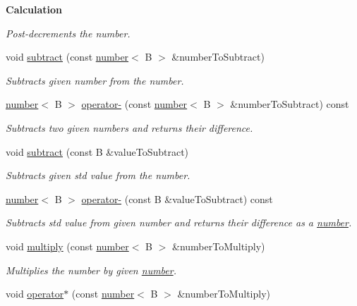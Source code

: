 \begin{Indent}{\bf Calculation}
\begin{DoxyCompactItemize}
\begin{DoxyCompactList}\small\item\em Post-\/decrements the number. \end{DoxyCompactList}\item 
void \hyperlink{classcjr_1_1number_aa29378479836924b1110f40570198ada}{subtract} (const \hyperlink{classcjr_1_1number}{number}$<$ B $>$ \&number\-To\-Subtract)
\begin{DoxyCompactList}\small\item\em Subtracts given number from the number. \end{DoxyCompactList}\item 
\hypertarget{classcjr_1_1number_a9b54e89597d8db867a7d30bab2c8d10a}{\hyperlink{classcjr_1_1number}{number}$<$ B $>$ \hyperlink{classcjr_1_1number_a9b54e89597d8db867a7d30bab2c8d10a}{operator-\/} (const \hyperlink{classcjr_1_1number}{number}$<$ B $>$ \&number\-To\-Subtract) const }\label{classcjr_1_1number_a9b54e89597d8db867a7d30bab2c8d10a}

\begin{DoxyCompactList}\small\item\em Subtracts two given numbers and returns their difference. \end{DoxyCompactList}\item 
void \hyperlink{classcjr_1_1number_af95e527ca950399a3af5dbf12d01afc5}{subtract} (const B \&value\-To\-Subtract)
\begin{DoxyCompactList}\small\item\em Subtracts given std value from the number. \end{DoxyCompactList}\item 
\hypertarget{classcjr_1_1number_ad48de2316e1e5c962c84eb4f4ad5cfc8}{\hyperlink{classcjr_1_1number}{number}$<$ B $>$ \hyperlink{classcjr_1_1number_ad48de2316e1e5c962c84eb4f4ad5cfc8}{operator-\/} (const B \&value\-To\-Subtract) const }\label{classcjr_1_1number_ad48de2316e1e5c962c84eb4f4ad5cfc8}

\begin{DoxyCompactList}\small\item\em Subtracts std value from given number and returns their difference as a \hyperlink{classcjr_1_1number}{number}. \end{DoxyCompactList}\item 
void \hyperlink{classcjr_1_1number_a9bfb2e6eb2297527aa34f21c84c92c1c}{multiply} (const \hyperlink{classcjr_1_1number}{number}$<$ B $>$ \&number\-To\-Multiply)
\begin{DoxyCompactList}\small\item\em Multiplies the number by given \hyperlink{classcjr_1_1number}{number}. \end{DoxyCompactList}\item 
\hypertarget{classcjr_1_1number_a8265613523915af2d0216560f144e84a}{void \hyperlink{classcjr_1_1number_a8265613523915af2d0216560f144e84a}{operator$\ast$} (const \hyperlink{classcjr_1_1number}{number}$<$ B $>$ \&number\-To\-Multiply)}\label{classcjr_1_1number_a8265613523915af2d0216560f144e84a}


\end{DoxyCompactItemize}
\end{Indent}
